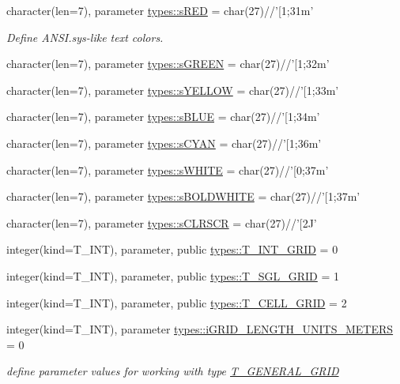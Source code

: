 \begin{DoxyCompactItemize}
\item 
character(len=7), parameter \hyperlink{namespacetypes_abb0ecc9c9b6f0e08002fec018d71001c}{types::sRED} = char(27)//'\mbox{[}1;31m'
\begin{DoxyCompactList}\small\item\em Define ANSI.sys-\/like text colors. \item\end{DoxyCompactList}\item 
character(len=7), parameter \hyperlink{namespacetypes_a07437ed48493a8bc7c3f5f73bd3b09ea}{types::sGREEN} = char(27)//'\mbox{[}1;32m'
\item 
character(len=7), parameter \hyperlink{namespacetypes_aea7cf70fa292d9310d8684a10a075b10}{types::sYELLOW} = char(27)//'\mbox{[}1;33m'
\item 
character(len=7), parameter \hyperlink{namespacetypes_a4bb1513c56bea1b41dd352849448a56c}{types::sBLUE} = char(27)//'\mbox{[}1;34m'
\item 
character(len=7), parameter \hyperlink{namespacetypes_a9bd2b67f7cec3b5778aa09574fa71152}{types::sCYAN} = char(27)//'\mbox{[}1;36m'
\item 
character(len=7), parameter \hyperlink{namespacetypes_a71a8a20288478902850fec078b982946}{types::sWHITE} = char(27)//'\mbox{[}0;37m'
\item 
character(len=7), parameter \hyperlink{namespacetypes_aefdf6f19388973d1aa8709be595c7c32}{types::sBOLDWHITE} = char(27)//'\mbox{[}1;37m'
\item 
character(len=7), parameter \hyperlink{namespacetypes_a92bb3d719410aa879a5823ffc5c3f647}{types::sCLRSCR} = char(27)//'\mbox{[}2J'
\item 
integer(kind=T\_\-INT), parameter, public \hyperlink{namespacetypes_acc2ffd0be776cd4fca9ebcfe4669e82c}{types::T\_\-INT\_\-GRID} = 0
\item 
integer(kind=T\_\-INT), parameter, public \hyperlink{namespacetypes_a328c49f52da66eddb0a59f71ea4235a3}{types::T\_\-SGL\_\-GRID} = 1
\item 
integer(kind=T\_\-INT), parameter, public \hyperlink{namespacetypes_a540676e3b79330fe7fa26455d749cb35}{types::T\_\-CELL\_\-GRID} = 2
\item 
integer(kind=T\_\-INT), parameter \hyperlink{namespacetypes_addaf796ce1bbf5d055d4b236092e0aaf}{types::iGRID\_\-LENGTH\_\-UNITS\_\-METERS} = 0
\begin{DoxyCompactList}\small\item\em define parameter values for working with type \hyperlink{typetypes_1_1_t___g_e_n_e_r_a_l___g_r_i_d}{T\_\-GENERAL\_\-GRID} \item\end{DoxyCompactList}\item 

\end{DoxyCompactItemize}
